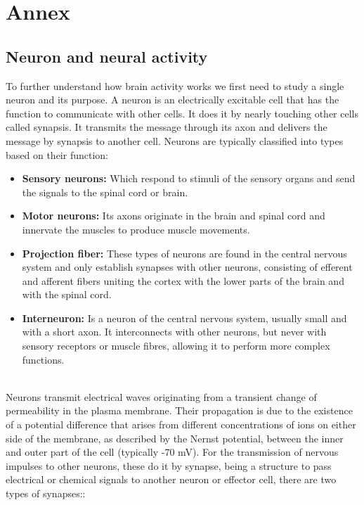 \section{Annex}
\label{sec-annex}

\subsection{Neuron and neural activity}
\label{subsec-neuron}
To further understand how brain activity works we first need to study a single neuron and its purpose. A neuron is an electrically excitable cell that has the function to communicate with other cells. It does it by nearly touching other cells called synapsis. It transmits the message through its axon and delivers the message by synapsis\cite{Synapse} to another cell. Neurons are typically classified into types based on their function:
\\
\begin{itemize}
  \item \textbf{Sensory neurons\cite{Sensoryneuron}:} Which respond to stimuli of the sensory organs and send the signals to the spinal cord or brain.
  \item \textbf{Motor neurons\cite{Motorneuron}:} Its axons originate in the brain and spinal cord and innervate the muscles to produce muscle movements.
  \item \textbf{Projection fiber\cite{Projectionfiber}:} These types of neurons are found in the central nervous system and only establish synapses with other neurons, consisting of efferent and afferent fibers uniting the cortex with the lower parts of the brain and with the spinal cord.
  \item \textbf{Interneuron\cite{Interneuron}:} Is a neuron of the central nervous system, usually small and with a short axon. It interconnects with other neurons, but never with sensory receptors or muscle fibres, allowing it to perform more complex functions.
\end{itemize}
\leavevmode\\
Neurons transmit electrical waves originating from a transient change of permeability in the plasma membrane. Their propagation is due to the existence of a potential difference that arises from different concentrations of ions on either side of the membrane, as described by the Nernst potential, between the inner and outer part of the cell (typically -70 mV). For the transmission of nervous impulses to other neurons, these do it by synapse, being a structure to pass electrical or chemical signals to another neuron or effector cell, there are two types of synapses:\cite{Synapse}:
